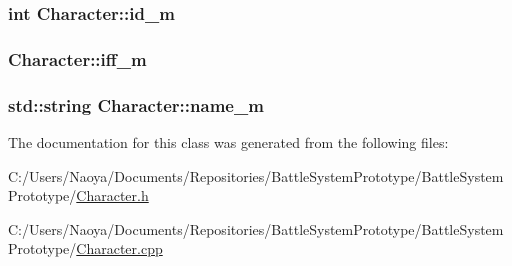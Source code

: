 \subsubsection[{id\+\_\+m}]{\setlength{\rightskip}{0pt plus 5cm}int Character\+::id\+\_\+m}\label{class_character_a5e51ea77e9178ae99a33901300e4bc40}
\hypertarget{class_character_a2ca852f598c4e20b5d932355379c4ac0}{}
\subsubsection[{iff\+\_\+m}]{ Character\+::iff\+\_\+m\hspace{0.3cm}{\ttfamily [protected]}}\label{class_character_a2ca852f598c4e20b5d932355379c4ac0}
\hypertarget{class_character_ae84b80fb6ac2e9271506c84b71d657f6}{}
\subsubsection[{name\+\_\+m}]{\setlength{\rightskip}{0pt plus 5cm}std\+::string Character\+::name\+\_\+m}\label{class_character_ae84b80fb6ac2e9271506c84b71d657f6}


The documentation for this class was generated from the following files\+:\begin{DoxyCompactItemize}
\item 
C\+:/\+Users/\+Naoya/\+Documents/\+Repositories/\+Battle\+System\+Prototype/\+Battle\+System\+Prototype/\hyperlink{_character_8h}{Character.\+h}\item 
C\+:/\+Users/\+Naoya/\+Documents/\+Repositories/\+Battle\+System\+Prototype/\+Battle\+System\+Prototype/\hyperlink{_character_8cpp}{Character.\+cpp}\end{DoxyCompactItemize}
